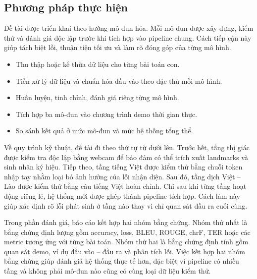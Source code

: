 ﻿\subsection{Phương pháp thực hiện}

Đề tài được triển khai theo hướng mô-đun hóa. Mỗi mô-đun được xây dựng, kiểm thử và đánh giá độc lập trước khi tích hợp vào pipeline chung. Cách tiếp cận này giúp tách biệt lỗi, thuận tiện tối ưu và làm rõ đóng góp của từng mô hình.

\begin{itemize}
    \item Thu thập hoặc kế thừa dữ liệu cho từng bài toán con.
    \item Tiền xử lý dữ liệu và chuẩn hóa đầu vào theo đặc thù mỗi mô hình.
    \item Huấn luyện, tinh chỉnh, đánh giá riêng từng mô hình.
    \item Tích hợp ba mô-đun vào chương trình demo thời gian thực.
    \item So sánh kết quả ở mức mô-đun và mức hệ thống tổng thể.
\end{itemize}

Về quy trình kỹ thuật, đề tài đi theo thứ tự từ dưới lên. Trước hết, tầng thị giác được kiểm tra độc lập bằng webcam để bảo đảm có thể trích xuất landmarks và sinh nhãn ký hiệu. Tiếp theo, tầng tiếng Việt được kiểm thử bằng chuỗi token nhập tay nhằm loại bỏ ảnh hưởng của lỗi nhận diện. Sau đó, tầng dịch Việt -- Lào được kiểm thử bằng câu tiếng Việt hoàn chỉnh. Chỉ sau khi từng tầng hoạt động riêng lẻ, hệ thống mới được ghép thành pipeline tích hợp. Cách làm này giúp xác định rõ lỗi phát sinh ở tầng nào thay vì chỉ quan sát đầu ra cuối cùng.

Trong phần đánh giá, báo cáo kết hợp hai nhóm bằng chứng. Nhóm thứ nhất là bằng chứng định lượng gồm accuracy, loss, BLEU, ROUGE, chrF, TER hoặc các metric tương ứng với từng bài toán. Nhóm thứ hai là bằng chứng định tính gồm quan sát demo, ví dụ đầu vào -- đầu ra và phân tích lỗi. Việc kết hợp hai nhóm bằng chứng giúp đánh giá hệ thống thực tế hơn, đặc biệt vì pipeline có nhiều tầng và không phải mô-đun nào cũng có cùng loại dữ liệu kiểm thử.

